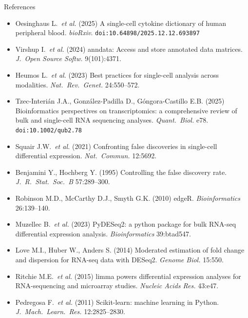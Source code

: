\documentclass[aspectratio=169,10pt]{beamer}
\begin{document}
\appendix
\begin{frame}{References}
  \scriptsize
  \begin{itemize}\setlength\itemsep{3pt}
    \item Oesinghaus L.\ \emph{et al.} (2025) A single-cell cytokine dictionary of human peripheral blood. \emph{bioRxiv}. \texttt{doi:10.64898/2025.12.12.693897}
    \item Virshup I.\ \emph{et al.} (2024) anndata: Access and store annotated data matrices. \emph{J.\ Open Source Softw.} 9(101):4371.
    \item Heumos L.\ \emph{et al.} (2023) Best practices for single-cell analysis across modalities. \emph{Nat.\ Rev.\ Genet.} 24:550--572.
    \item Tzec-Interi\'an J.A., Gonz\'alez-Padilla D., G\'ongora-Castillo E.B. (2025) Bioinformatics perspectives on transcriptomics: a comprehensive review of bulk and single-cell RNA sequencing analyses. \emph{Quant.\ Biol.} e78. \texttt{doi:10.1002/qub2.78}
    \item Squair J.W.\ \emph{et al.} (2021) Confronting false discoveries in single-cell differential expression. \emph{Nat.\ Commun.} 12:5692.
    \item Benjamini Y., Hochberg Y. (1995) Controlling the false discovery rate. \emph{J.\ R.\ Stat.\ Soc.\ B} 57:289--300.
    \item Robinson M.D., McCarthy D.J., Smyth G.K. (2010) edgeR. \emph{Bioinformatics} 26:139--140.
    \item Muzellec B.\ \emph{et al.} (2023) PyDESeq2: a python package for bulk RNA-seq differential expression analysis. \emph{Bioinformatics} 39:btad547.
    \item Love M.I., Huber W., Anders S. (2014) Moderated estimation of fold change and dispersion for RNA-seq data with DESeq2. \emph{Genome Biol.} 15:550.
    \item Ritchie M.E.\ \emph{et al.} (2015) limma powers differential expression analyses for RNA-sequencing and microarray studies. \emph{Nucleic Acids Res.} 43:e47.
    \item Pedregosa F.\ \emph{et al.} (2011) Scikit-learn: machine learning in Python. \emph{J.\ Mach.\ Learn.\ Res.} 12:2825--2830.
  \end{itemize}
\end{frame}
\end{document}
